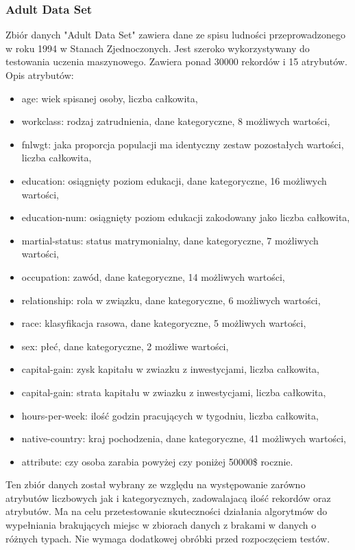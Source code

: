 \documentclass[12pt,twoside]{article}
\begin{document}
\subsubsection{Adult Data Set}
Zbiór danych "Adult Data Set" zawiera dane ze spisu ludności przeprowadzonego w roku 1994 w Stanach Zjednoczonych.
Jest szeroko wykorzystywany do testowania uczenia maszynowego.
Zawiera ponad 30000 rekordów i 15 atrybutów. \cite{adult} Opis atrybutów:
\begin{itemize}[label=-,labelsep=0.4cm, leftmargin=1.25cm]
    \item age: wiek spisanej osoby, liczba całkowita,
    \item workclass: rodzaj zatrudnienia, dane kategoryczne, 8 możliwych wartości,
    \item fnlwgt: jaka proporcja populacji ma identyczny zestaw pozostałych wartości, liczba całkowita,
    \item education: osiągnięty poziom edukacji, dane kategoryczne, 16 możliwych wartości,
    \item education-num: osiągnięty poziom edukacji zakodowany jako liczba całkowita,
    \item martial-status: status matrymonialny, dane kategoryczne, 7 możliwych wartości,
    \item occupation: zawód, dane kategoryczne, 14 możliwych wartości,
    \item relationship: rola w związku, dane kategoryczne, 6 możliwych wartości,
    \item race: klasyfikacja rasowa, dane kategoryczne, 5 możliwych wartości,
    \item sex: płeć, dane kategoryczne, 2 możliwe wartości,
    \item capital-gain: zysk kapitału w zwiazku z inwestycjami, liczba całkowita,
    \item capital-gain: strata kapitału w zwiazku z inwestycjami, liczba całkowita,
    \item hours-per-week: ilość godzin pracujących w tygodniu, liczba całkowita,
    \item native-country: kraj pochodzenia, dane kategoryczne, 41 możliwych wartości,
    \item attribute: czy osoba zarabia powyżej czy poniżej 50000\$ rocznie.
\end{itemize}
Ten zbiór danych został wybrany ze względu na występowanie zarówno atrybutów liczbowych jak i kategorycznych, zadowalajacą ilość rekordów oraz atrybutów.
Ma na celu przetestowanie skuteczności działania algorytmów do wypełniania brakujących miejsc w zbiorach danych z brakami w danych o różnych typach.
Nie wymaga dodatkowej obróbki przed rozpoczęciem testów. 
\end{document}
